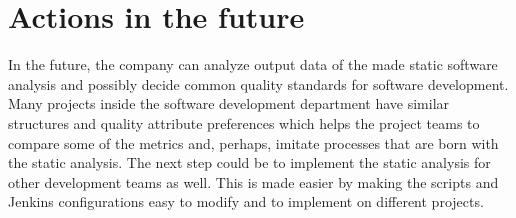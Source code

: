 \section{Actions in the future}


In the future, the company can analyze output data of the made static software analysis and possibly decide common quality standards for software development. Many projects inside the software development department have similar structures and quality attribute preferences which helps the project teams to compare some of the metrics and, perhaps, imitate processes that are born with the static analysis. The next step could be to implement the static analysis for other development teams as well. This is made easier by making the scripts and Jenkins configurations easy to modify and to implement on different projects.







